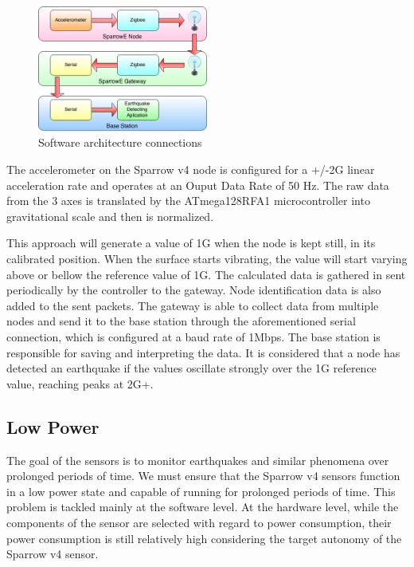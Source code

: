 \begin{figure}[ht] \centering
  \includegraphics[width=0.5\textwidth]{img/software-architecture.png}
  \caption{Software architecture connections}
\end{figure}

The accelerometer on the Sparrow v4 node is configured for a +/-2G linear acceleration rate and operates at an Ouput Data Rate of 50 Hz. 
The raw data from the 3 axes is translated by the ATmega128RFA1 microcontroller into gravitational scale and then is normalized.

This approach will generate a value of 1G when the node is kept still, in its calibrated position. When the surface starts vibrating, the value will start varying 
above or bellow the reference value of 1G. The calculated data is gathered in sent periodically by the controller to the 
gateway. Node identification data is also added to the sent packets. The gateway is able to collect data from multiple nodes and send it to the base station through
the aforementioned serial connection, which is configured at a baud rate of 1Mbps. The base station is responsible for saving and interpreting the data. 
It is considered that a node has detected an earthquake if the values oscillate strongly over the 1G reference value, reaching peaks at 2G+.

\subsection{Low Power}

The goal of the sensors is to monitor earthquakes and similar phenomena over prolonged periods of time. We must ensure that the Sparrow v4 sensors function in a low power
state and capable of running for prolonged periods of time. This problem is tackled mainly at the software level. At the hardware level, while the components of the sensor 
are selected with regard to power consumption, their power consumption is still relatively high considering the target autonomy of the Sparrow v4 sensor.

